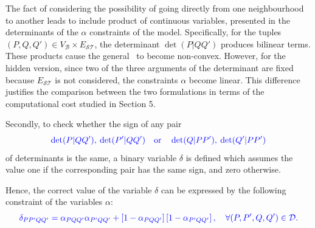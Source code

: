 \documentclass[a4paper,  review, authoryear, 1p.]{elsarticle}
\newcommand{\KMPN}{{\sf{H-KMPN}\xspace }}
\newcommand{\VB}{{V^{}_{\mathcal B}}}
\newcommand{\JP}[1]{{\color{blue}#1}}
\newcommand{\CV}[1]{{\color{blue}#1}}
\newcommand{\determinant}[3]{\det({#1|#2#3})}
\begin{document}
	\JP{The fact of considering the possibility of going directly from one neighbourhood  to another leads to include product of continuous variables, presented in the determinants of the $\alpha$ constraints of the model. Specifically, for the tuples $(P, Q, Q')\in V_\mathcal B\times E_{\mathcal S\mathcal T}$, the determinant $\det(P|QQ')$ produces bilinear terms. These products cause the general \KMPN \ to become non-convex. However, for the hidden version, since two of the three arguments of the determinant are fixed because $E_{\mathcal S\mathcal T}$ is not considered, the constraints $\alpha$ become linear. This difference justifies the comparison between the two formulations in terms of the computational cost studied in Section 5.}
			 
	Secondly, to check whether the sign of any pair
	\begin{equation}\label{eq:pair}
		\CV{\determinant{P}{Q}{Q'},\: \determinant{P'}{Q}{Q'}\quad \text{or} \quad \determinant{Q}{P}{P'},\:	 \determinant{Q'}{P}{P'}}
	\end{equation} 
	of determinants is the same, a binary variable $\delta$ is defined which assumes the value one if the corresponding pair has the same sign, and zero otherwise.
	
	\newcommand{\varepsilonprod}[4]{\varepsilon_{#1#2#3#4}}
	
	Hence, the correct value of the variable $\delta$ can be expressed by the following constraint of the variables $\alpha$:
	\begin{equation*}%
		\CV{\deltamas{P}{P'}{Q}{Q'}=\alphamas{P}{Q}{Q'}\alphamas{P'}{Q}{Q'} + \left[1-\alphamas{P}{Q}{Q'}\right]\left[1-\alphamas{P'}{Q}{Q'}\right],\quad\forall (P,P',Q,Q')\in\mathcal D.}	
	\end{equation*}
	
\end{document}
